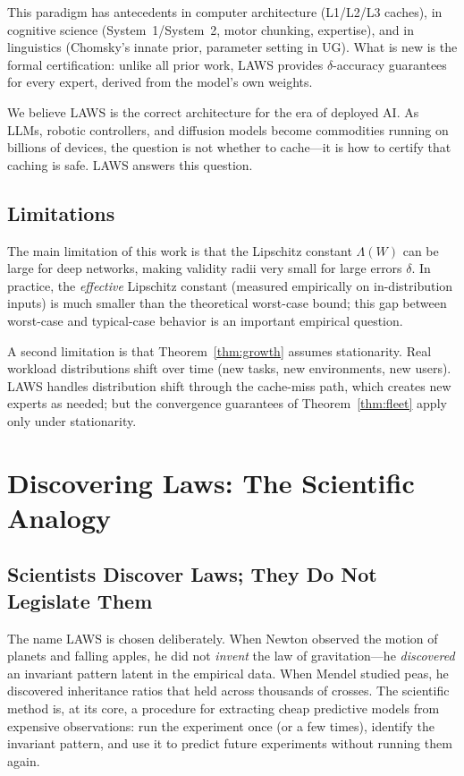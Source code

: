 \documentclass[11pt]{article}
\begin{document}
This paradigm has antecedents in computer architecture (L1/L2/L3 caches),
in cognitive science (System~1/System~2, motor chunking, expertise), and
in linguistics (Chomsky's innate prior, parameter setting in UG).  What is
new is the formal certification: unlike all prior work, LAWS provides
$\delta$-accuracy guarantees for every expert, derived from the model's own
weights.

We believe LAWS is the correct architecture for the era of deployed AI.
As LLMs, robotic controllers, and diffusion models become commodities running
on billions of devices, the question is not whether to cache---it is how to
certify that caching is safe.  LAWS answers this question.

\subsection{Limitations}

The main limitation of this work is that the Lipschitz constant $\Lambda(W)$
can be large for deep networks, making validity radii very small for large
errors $\delta$.  In practice, the \emph{effective} Lipschitz constant (measured
empirically on in-distribution inputs) is much smaller than the theoretical
worst-case bound; this gap between worst-case and typical-case behavior is
an important empirical question.

A second limitation is that Theorem~\ref{thm:growth} assumes stationarity.
Real workload distributions shift over time (new tasks, new environments, new
users).  LAWS handles distribution shift through the cache-miss path, which
creates new experts as needed; but the convergence guarantees of
Theorem~\ref{thm:fleet} apply only under stationarity.

\section{Discovering Laws: The Scientific Analogy}
\label{sec:natural_laws}

\subsection{Scientists Discover Laws; They Do Not Legislate Them}

The name LAWS is chosen deliberately.  When Newton observed the motion of
planets and falling apples, he did not \emph{invent} the law of gravitation---he
\emph{discovered} an invariant pattern latent in the empirical data.  When
Mendel studied peas, he discovered inheritance ratios that held across thousands
of crosses.  The scientific method is, at its core, a procedure for extracting
cheap predictive models from expensive observations: run the experiment once
(or a few times), identify the invariant pattern, and use it to predict
future experiments without running them again.
\end{document}
